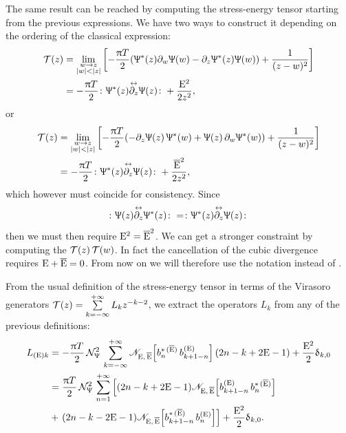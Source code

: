 The same result can be reached by computing the stress-energy tensor starting from the previous expressions.
We have two ways to construct it depending on the ordering of the classical expression:
\begin{equation}
  \begin{split}
    \cT( z )
    & =
    \lim\limits_{\substack{w \to z \\ \abs{w} < \abs{z}}}
    \qty[%
      -\frac{\pi T}{2}
      \qty(%
        \Psi^*( z ) \ipd{w} \Psi( w )
        -
        \ipd{z} \Psi^*( z ) \Psi( w )
      )
      +
      \frac{1}{( z- w )^2}
    ]
    \\
    & =
    -\frac{\pi T}{2}
    \no{ \Psi^*( z ) \lripd{z} \Psi( z ) }
    +
    \frac{\rE^2}{2 z^2},
  \end{split}
  \label{eq:T_excited_vacuum}
\end{equation}
or
\begin{equation}      
  \begin{split}
    \cT( z )
    & =
    \lim\limits_{\substack{w \to z \\ \abs{w} < \abs{z}}}
    \qty[%
      -\frac{\pi T}{2}
      \qty(%
        -
        \ipd{z} \Psi( z )\, \Psi^*( w )
        +
        \Psi( z )\, \ipd{w} \Psi^*( w )
      )
    +
    \frac{1}{( z -  w )^2}
    ]
    \\
    & =
    -\frac{\pi T}{2}
    \no{ \Psi^*( z ) \lripd{z} \Psi( z ) }
    +
    \frac{\brE^2}{2 z^2},
  \end{split}
\end{equation}
which however must coincide for consistency.
Since
\begin{equation}
  \colon  \Uppsi( z ) \overset{\leftrightarrow}{\partial_{z}} \Uppsi^*( z )  \colon
  =
  \colon  \Uppsi^*( z ) \overset{\leftrightarrow}{\partial_{z}} \Uppsi( z )  \colon
\end{equation}
then we must then require $\mathrm{E}^2 = \overline{\mathrm{E}}^2$.
We can  get a stronger constraint by computing the \ope $\mathcal{T}( z )\, \mathcal{T}( w )$.
In fact the cancellation of the cubic divergence requires $\mathrm{E} + \overline{\mathrm{E}} = 0$.
From now on we will therefore use the notation \eexcvacket instead of \excvacket.

From the usual definition of the stress-energy tensor in terms of the Virasoro generators $\mathcal{T}( z ) = \sum\limits_{k = -\infty}^{+\infty} L_k z^{-k-2}$, we extract the operators $L_k$ from any of the previous definitions:
\begin{equation}
  \begin{split}
    L_{(\mathrm{E}) k}
    & =
    -\frac{\uppi T}{2}\, \mathcal{N}_{\Uppsi}^2\,
    \sum\limits_{k = -\infty}^{+\infty}
    \mathscr{N}_{\mathrm{E},\, \overline{\mathrm{E}}}\qty[ b^{*\, ( \overline{\mathrm{E}} )}_n\, b^{(\mathrm{E})}_{k + 1 - n} ]
    ( 2n - k + 2 \mathrm{E} - 1 ) 
    +
    \frac{\mathrm{E}^2}{2} \updelta_{k,0}
    \\
    & =
    \frac{\uppi T}{2}\, \mathcal{N}_{\Uppsi}^2\,
    \sum\limits_{n = 1}^{+\infty}
    \left[
      ( 2n - k + 2 \mathrm{E} - 1 ) 
      \mathscr{N}_{\mathrm{E},\, \overline{\mathrm{E}}}\qty[ b^{(\mathrm{E})}_{k + 1 - n}\, b^{*\, ( \overline{\mathrm{E}} )}_n ]
    \right.
      \\
    & +
    \left.
      ( 2n - k - 2 \mathrm{E} - 1 ) 
      \mathscr{N}_{\mathrm{E},\, \overline{\mathrm{E}}}\qty[ b^{*\, ( \overline{\mathrm{E}} )}_{k + 1 - n}\, b^{(\mathrm{E})}_n ] 
    \right]
    +
    \frac{\mathrm{E}^2}{2} \updelta_{k,0}.
  \end{split}
\end{equation}

